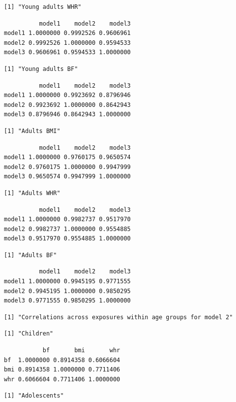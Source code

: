 \documentclass[11pt,twoside]{bristolthesis}
\begin{document}
\begin{verbatim}
[1] "Young adults WHR"
\end{verbatim}
\begin{verbatim}
          model1    model2    model3
model1 1.0000000 0.9992526 0.9606961
model2 0.9992526 1.0000000 0.9594533
model3 0.9606961 0.9594533 1.0000000
\end{verbatim}
\begin{verbatim}
[1] "Young adults BF"
\end{verbatim}
\begin{verbatim}
          model1    model2    model3
model1 1.0000000 0.9923692 0.8796946
model2 0.9923692 1.0000000 0.8642943
model3 0.8796946 0.8642943 1.0000000
\end{verbatim}
\begin{verbatim}
[1] "Adults BMI"
\end{verbatim}
\begin{verbatim}
          model1    model2    model3
model1 1.0000000 0.9760175 0.9650574
model2 0.9760175 1.0000000 0.9947999
model3 0.9650574 0.9947999 1.0000000
\end{verbatim}
\begin{verbatim}
[1] "Adults WHR"
\end{verbatim}
\begin{verbatim}
          model1    model2    model3
model1 1.0000000 0.9982737 0.9517970
model2 0.9982737 1.0000000 0.9554885
model3 0.9517970 0.9554885 1.0000000
\end{verbatim}
\begin{verbatim}
[1] "Adults BF"
\end{verbatim}
\begin{verbatim}
          model1    model2    model3
model1 1.0000000 0.9945195 0.9771555
model2 0.9945195 1.0000000 0.9850295
model3 0.9771555 0.9850295 1.0000000
\end{verbatim}
\begin{verbatim}
[1] "Correlations across exposures within age groups for model 2"
\end{verbatim}
\begin{verbatim}
[1] "Children"
\end{verbatim}
\begin{verbatim}
           bf       bmi       whr
bf  1.0000000 0.8914358 0.6066604
bmi 0.8914358 1.0000000 0.7711406
whr 0.6066604 0.7711406 1.0000000
\end{verbatim}
\begin{verbatim}
[1] "Adolescents"
\end{verbatim}
\end{document}
